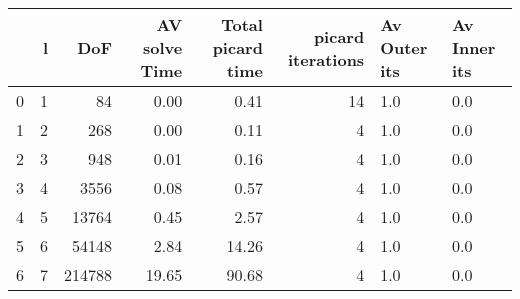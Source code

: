 \begin{tabular}{lrrrrrll}
\toprule
{} &  l &     DoF &  AV solve Time &  Total picard time &  picard iterations & Av Outer its & Av Inner its \\
\midrule
0 &  1 &      84 &           0.00 &               0.41 &                 14 &          1.0 &          0.0 \\
1 &  2 &     268 &           0.00 &               0.11 &                  4 &          1.0 &          0.0 \\
2 &  3 &     948 &           0.01 &               0.16 &                  4 &          1.0 &          0.0 \\
3 &  4 &    3556 &           0.08 &               0.57 &                  4 &          1.0 &          0.0 \\
4 &  5 &   13764 &           0.45 &               2.57 &                  4 &          1.0 &          0.0 \\
5 &  6 &   54148 &           2.84 &              14.26 &                  4 &          1.0 &          0.0 \\
6 &  7 &  214788 &          19.65 &              90.68 &                  4 &          1.0 &          0.0 \\
\bottomrule
\end{tabular}
